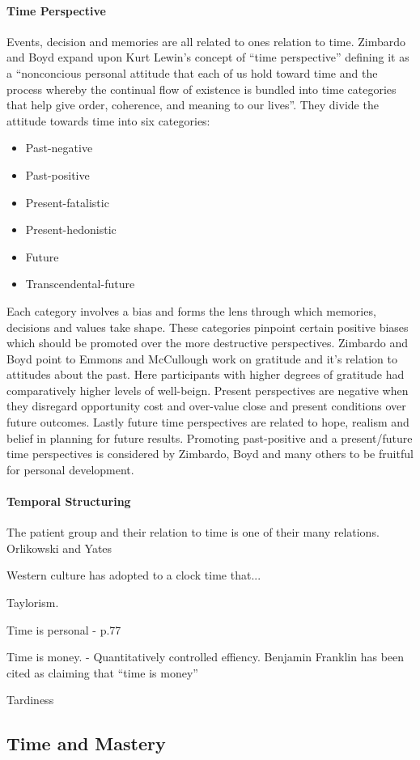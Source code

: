 \documentclass[11pt,UKenglish, a4paper]{article}
\begin{document}
\paragraph*{Time Perspective}
Events, decision and memories are all related to ones relation to time. 
Zimbardo and Boyd expand upon Kurt Lewin's concept of ``time perspective'' defining it as a ``nonconcious personal attitude that each of us hold toward time and the process whereby the continual flow of existence is bundled into time categories that help give order, coherence, and meaning to our lives''\cite[p.~51]{Zimbardo2008Time}. They divide the attitude towards time into six categories: 
\begin{itemize}
\item{Past-negative}
\item{Past-positive}
\item{Present-fatalistic}
\item{Present-hedonistic}
\item{Future}
\item{Transcendental-future}
\end{itemize}\cite[p.~52]{Zimbardo2008Time}
Each category involves a bias and forms the lens through which memories, decisions and values take shape. These categories pinpoint certain positive biases which should be promoted over the more destructive perspectives. Zimbardo and Boyd point to Emmons and McCullough work on gratitude and it's relation to attitudes about the past. Here participants with higher degrees of gratitude had comparatively higher levels of well-beign. Present perspectives are negative when they disregard opportunity cost and over-value close and present conditions over future outcomes. Lastly future time perspectives are related to hope, realism and belief in planning for future results\cite[]{Zimbardo2008Time}. 
Promoting past-positive and a present/future time perspectives is considered by Zimbardo, Boyd and many others to be fruitful for personal development. 

\paragraph*{Temporal Structuring}
The patient group and their relation to time is one of their many relations. Orlikowski and Yates 

Western culture has adopted to a clock time that... 

Taylorism.

Time is personal - p.77

Time is money. - Quantitatively controlled effiency.
Benjamin Franklin has been cited as claiming that ``time is money''

Tardiness
\subsection{Time and Mastery}
 
\end{document}
